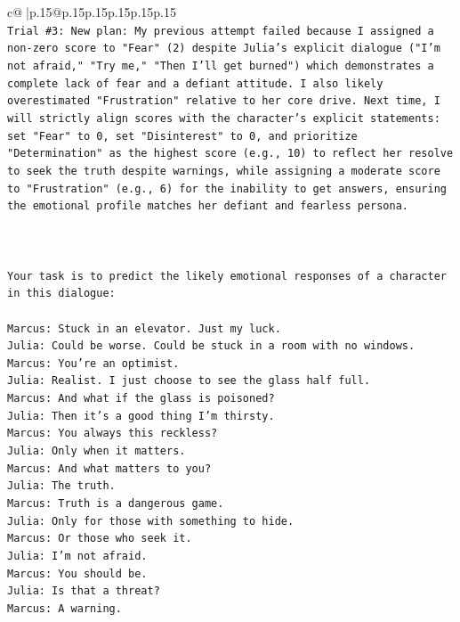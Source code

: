\documentclass{article}
\begin{document}
{\begin{supertabular}{c@{$\;$}|p{.15\linewidth}@{}p{.15\linewidth}p{.15\linewidth}p{.15\linewidth}p{.15\linewidth}p{.15\linewidth}}
{{{\\ 
\texttt{Trial \#3: New plan: My previous attempt failed because I assigned a non{-}zero score to "Fear" (2) despite Julia's explicit dialogue ("I'm not afraid," "Try me," "Then I'll get burned") which demonstrates a complete lack of fear and a defiant attitude. I also likely overestimated "Frustration" relative to her core drive. Next time, I will strictly align scores with the character's explicit statements: set "Fear" to 0, set "Disinterest" to 0, and prioritize "Determination" as the highest score (e.g., 10) to reflect her resolve to seek the truth despite warnings, while assigning a moderate score to "Frustration" (e.g., 6) for the inability to get answers, ensuring the emotional profile matches her defiant and fearless persona.} \\
\\ 
\\ 
\\ 
\texttt{Your task is to predict the likely emotional responses of a character in this dialogue:} \\
\\ 
\texttt{Marcus: Stuck in an elevator. Just my luck.} \\
\texttt{Julia: Could be worse. Could be stuck in a room with no windows.} \\
\texttt{Marcus: You're an optimist.} \\
\texttt{Julia: Realist. I just choose to see the glass half full.} \\
\texttt{Marcus: And what if the glass is poisoned?} \\
\texttt{Julia: Then it's a good thing I'm thirsty.} \\
\texttt{Marcus: You always this reckless?} \\
\texttt{Julia: Only when it matters.} \\
\texttt{Marcus: And what matters to you?} \\
\texttt{Julia: The truth.} \\
\texttt{Marcus: Truth is a dangerous game.} \\
\texttt{Julia: Only for those with something to hide.} \\
\texttt{Marcus: Or those who seek it.} \\
\texttt{Julia: I'm not afraid.} \\
\texttt{Marcus: You should be.} \\
\texttt{Julia: Is that a threat?} \\
\texttt{Marcus: A warning.} \\
}}}
\end{supertabular}}
\end{document}
